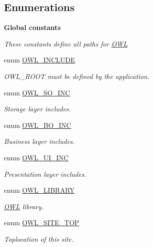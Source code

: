 \subsection*{Enumerations}
\begin{Indent}{\bf Global constants}\par
{\em \label{_amgrp08b298bc013f410cd1f593c409434f9b}
 These constants define all paths for \hyperlink{classOWL}{OWL} }\begin{DoxyCompactItemize}
\item 
enum \hyperlink{OWLloader_8php_a4d33a8f2fcc9c83cbeea921c4cb23a7f}{OWL\_\-INCLUDE} 
\begin{DoxyCompactList}\small\item\em OWL\_\-ROOT must be defined by the application. \item\end{DoxyCompactList}\item 
enum \hyperlink{OWLloader_8php_a75dffdef5ba58a0ba5f21ed40627897f}{OWL\_\-SO\_\-INC} 
\begin{DoxyCompactList}\small\item\em Storage layer includes. \item\end{DoxyCompactList}\item 
enum \hyperlink{OWLloader_8php_aca50646bc73c3addf0e0f25081eae0ae}{OWL\_\-BO\_\-INC} 
\begin{DoxyCompactList}\small\item\em Business layer includes. \item\end{DoxyCompactList}\item 
enum \hyperlink{OWLloader_8php_a2e11101c70f011a91d0d9c7f8e217738}{OWL\_\-UI\_\-INC} 
\begin{DoxyCompactList}\small\item\em Presentation layer includes. \item\end{DoxyCompactList}\item 
enum \hyperlink{OWLloader_8php_a74eed08508c8b70677c4167acf49e427}{OWL\_\-LIBRARY} 
\begin{DoxyCompactList}\small\item\em \hyperlink{classOWL}{OWL} library. \item\end{DoxyCompactList}\item 
enum \hyperlink{OWLloader_8php_a462de9ae02e394313337afac5d1a5f95}{OWL\_\-SITE\_\-TOP} 
\begin{DoxyCompactList}\small\item\em Toplocation of this site. \item\end{DoxyCompactList}\end{DoxyCompactItemize}
\end{Indent}

